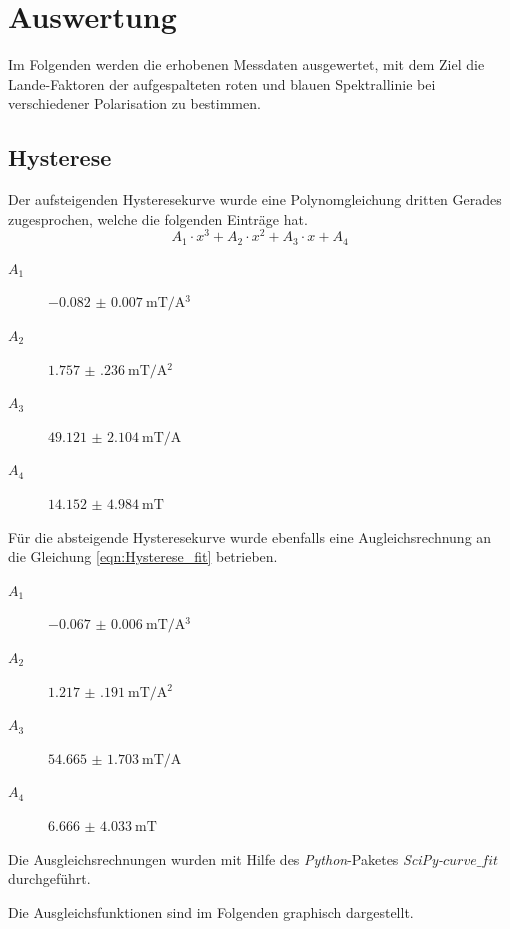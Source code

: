 \section{Auswertung}

Im Folgenden werden die erhobenen Messdaten ausgewertet, mit dem Ziel
die Lande-Faktoren der aufgespalteten roten und blauen Spektrallinie bei verschiedener
Polarisation zu bestimmen.

\subsection{Hysterese}

Der aufsteigenden Hysteresekurve wurde eine Polynomgleichung dritten Gerades zugesprochen,
welche die folgenden Einträge hat.
\begin{equation}
  \label{eqn:Hysterese_fit}
  A_1 \cdot x^3 + A_2 \cdot x^2 + A_3 \cdot x + A_4
\end{equation}
\begin{description}
  \item[$A_1$] $\SI{-0.082(7)}{\milli\tesla\per\ampere^3}$
  \item[$A_2$] $\SI{1.757(236)}{\milli\tesla\per\ampere^2}$
  \item[$A_3$] $\SI{49.121(2104)}{\milli\tesla\per\ampere}$
  \item[$A_4$] $\SI{14.152(4984)}{\milli\tesla}$
\end{description}

Für die absteigende Hysteresekurve wurde ebenfalls eine Augleichsrechnung an die
Gleichung \eqref{eqn:Hysterese_fit} betrieben.
\begin{description}
  \item[$A_1$] $\SI{-0.067(6)}{\milli\tesla\per\ampere^3}$
  \item[$A_2$] $\SI{1.217(191)}{\milli\tesla\per\ampere^2}$
  \item[$A_3$] $\SI{54.665(1703)}{\milli\tesla\per\ampere}$
  \item[$A_4$] $\SI{6.666(4033)}{\milli\tesla}$
\end{description}

Die Ausgleichsrechnungen wurden mit Hilfe des \emph{Python}-Paketes
\emph{SciPy-$curve\_fit$} durchgeführt.

Die Ausgleichsfunktionen sind im Folgenden graphisch dargestellt.

